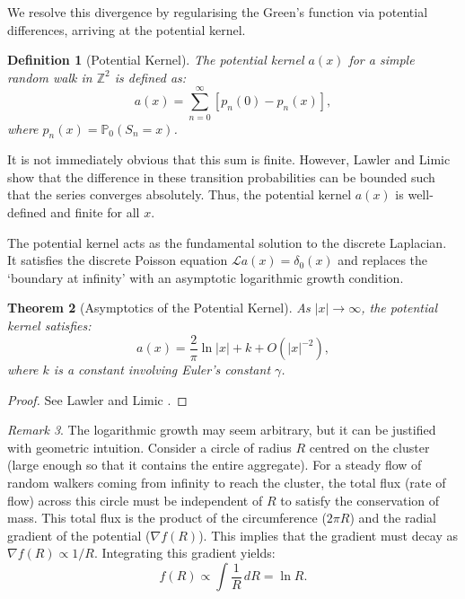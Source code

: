 \documentclass[12pt, a4paper, oneside]{report}
\newtheorem{theorem}{Theorem}[chapter]
\newtheorem{definition}[theorem]{Definition}
\theoremstyle{remark}
\newtheorem{remark}[theorem]{Remark}
\begin{document}
We resolve this divergence by regularising the Green's function via potential differences, arriving at the potential kernel.

\begin{definition}[Potential Kernel]
    \label{def:pot_kernel}
The potential kernel $a(x)$ for a simple random walk in $\mathbb{Z}^2$ is defined as:
\begin{equation*}
    a(x) = \sum_{n=0}^\infty [p_n(0) - p_n(x)],
\end{equation*}
where $p_n(x) = \mathbb{P}_0(S_n = x)$.
\end{definition}

It is not immediately obvious that this sum is finite. However, Lawler and Limic \cite[Section 4.4.1]{Lawler2010} show that the difference in these transition probabilities can be bounded such that the series converges absolutely. Thus, the potential kernel $a(x)$ is well-defined and finite for all $x$. 

The potential kernel acts as the fundamental solution to the discrete Laplacian. It satisfies the discrete Poisson equation $\mathcal{L}a(x) = \delta_0(x)$ and replaces the `boundary at infinity' with an asymptotic logarithmic growth condition.

\begin{theorem}[Asymptotics of the Potential Kernel]
As $|x| \to \infty$, the potential kernel satisfies:
\begin{equation*}
    a(x) = \frac{2}{\pi} \ln |x| + k + O(|x|^{-2}),
\end{equation*}
where $k$ is a constant involving Euler's constant $\gamma$.
\end{theorem}
\begin{proof}
See Lawler and Limic \cite[Theorem 4.4.4]{Lawler2010}.
\end{proof}

\begin{remark}
The logarithmic growth may seem arbitrary, but it can be justified with geometric intuition. Consider a circle of radius $R$ centred on the cluster (large enough so that it contains the entire aggregate). For a steady flow of random walkers coming from infinity to reach the cluster, the total flux (rate of flow) across this circle must be independent of $R$ to satisfy the conservation of mass. This total flux is the product of the circumference ($2\pi R$) and the radial gradient of the potential ($\nabla f(R)$). This implies that the gradient must decay as $\nabla f(R) \propto 1/R$. Integrating this gradient yields:
\begin{equation*}
    f(R) \propto \int \frac{1}{R} \, dR = \ln R.
\end{equation*}
\end{remark}
\end{document}

